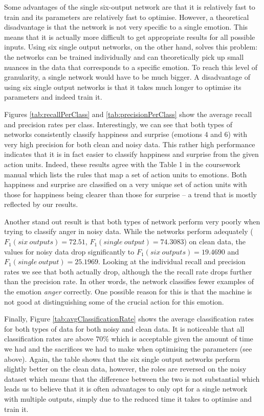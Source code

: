 \documentclass[10pt,a4paper]{article}
\begin{document}
Some advantages of the single six-output network are that it is relatively fast to train and its parameters are relatively fast to optimise. However, a theoretical disadvantage is that the network is not very specific to a single emotion. This means that it is actually more difficult to get appropriate results for all possible inputs. Using six single output networks, on the other hand, solves this problem: the networks can be trained individually and can theoretically pick up small nuances in the data that corresponds to a specific emotion. To reach this level of granularity, a single network would have to be much bigger. A disadvantage of using six single output networks is that it takes much longer to optimise its parameters and indeed train it.

Figures \ref{tab:recallPerClass}  and \ref{tab:precisionPerClass} show the average recall and precision rates per class. Interestingly, we can see that both types of networks consistently classify happiness and surprise (emotions 4 and 6) with very high precision for both clean and noisy data. This rather high performance indicates that it is in fact easier to classify happiness and surprise from the given action units. Indeed, these results agree with the Table 1 in the coursework manual which lists the rules that map a set of action units to emotions. Both happiness and surprise are classified on a very unique set of action units with those for happiness being clearer than those for surprise -- a trend that is mostly reflected by our results.

Another stand out result is that both types of network perform very poorly when trying to classify anger in noisy data. While the networks perform adequately ($F_1(six~outputs) = 72.51$, $F_1(single~output) = 74.3083$) on clean data, the values for noisy data drop significantly to $F_1(six~outputs) = 19.4690$ and $F_1(single~output) = 25.1969$. Looking at the individual recall and precision rates we see that both actually drop, although the the recall rate drops further than the precision rate. In other words, the network classifies fewer examples of the emotion \emph{anger} correctly. One possible reason for this is that the machine is not good at distinguishing some of the crucial action for this emotion.

Finally, Figure \ref{tab:avgClassificationRate} shows the average classification rates for both types of data for both noisy and clean data. It is noticeable that all classification rates are above $70\%$ which is acceptable given the amount of time we had and the sacrifices we had to make when optimising the parameters (see above). Again, the table shows that the six single output networks perform slightly better on the clean data, however, the roles are reversed on the noisy dataset which means that the difference between the two is not substantial which leads us to believe that it is often advantages to only opt for a single network with multiple outputs, simply due to the reduced time it takes to optimise and train it.
\end{document}
